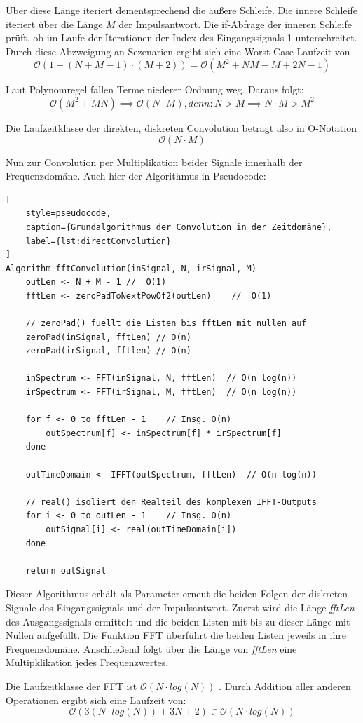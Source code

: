Über diese Länge iteriert dementsprechend die äußere Schleife.
Die innere Schleife iteriert über die Länge $M$ der Impulsantwort.
Die if-Abfrage der inneren Schleife prüft, ob im Laufe der Iterationen
der Index des Eingangssignals 1 unterschreitet.
Durch diese Abzweigung an Sezenarien ergibt sich eine Worst-Case Laufzeit von
\begin{equation}
\mathcal{O}(1 + (N + M - 1) \cdot (M + 2)) = \mathcal{O}(M^2 + NM - M + 2N - 1)
\end{equation}

Laut Polynomregel fallen Terme niederer Ordnung weg. Daraus folgt:
\begin{equation}
    \mathcal{O}(M^2 + MN) \implies \mathcal{O}(N \cdot M)
     , denn: N > M \implies N \cdot M > M^2
\end{equation}

Die Laufzeitklasse der direkten, diskreten Convolution beträgt also in O-Notation
\begin{equation}
\mathcal{O}(N \cdot M)
\end{equation}

Nun zur Convolution per Multiplikation beider Signale innerhalb der Frequenzdomäne.
Auch hier der Algorithmus in Pseudocode:

\begin{lstlisting}[
    style=pseudocode,
    caption={Grundalgorithmus der Convolution in der Zeitdomäne},
    label={lst:directConvolution}
]
Algorithm fftConvolution(inSignal, N, irSignal, M)
    outLen <- N + M - 1 //  O(1)
    fftLen <- zeroPadToNextPowOf2(outLen)    //  O(1)

    // zeroPad() fuellt die Listen bis fftLen mit nullen auf
    zeroPad(inSignal, fftLen) // O(n)
    zeroPad(irSignal, fftlen) // O(n)

    inSpectrum <- FFT(inSignal, N, fftLen)  // O(n log(n))
    irSpectrum <- FFT(irSignal, M, fftLen)  // O(n log(n))

    for f <- 0 to fftLen - 1    // Insg. O(n)
        outSpectrum[f] <- inSpectrum[f] * irSpectrum[f]
    done

    outTimeDomain <- IFFT(outSpectrum, fftLen)  // O(n log(n))

    // real() isoliert den Realteil des komplexen IFFT-Outputs
    for i <- 0 to outLen - 1    // Insg. O(n)
        outSignal[i] <- real(outTimeDomain[i])
    done

    return outSignal
\end{lstlisting}

Dieser Algorithmus erhält als Parameter erneut die beiden Folgen der diskreten Signale
des Eingangssignals und der Impulsantwort.
Zuerst wird die Länge \textit{fftLen} des Ausgangssignals ermittelt und die beiden Listen mit bis zu
dieser Länge mit Nullen aufgefüllt.
Die Funktion FFT überführt die beiden Listen jeweils in ihre Frequenzdomäne.
Anschließend folgt über die Länge von \textit{fftLen} eine Multipklikation jedes Frequenzwertes.

Die Laufzeitklasse der FFT ist $\mathcal{O}(N \cdot log(N))$ \cite[Kap. 12] {smith1997}. Durch Addition aller anderen
Operationen ergibt sich eine Laufzeit von:
\begin{equation}
    \mathcal{O}(3(N \cdot log(N)) + 3N + 2) \in \mathcal{O}(N \cdot log(N))
\end{equation}